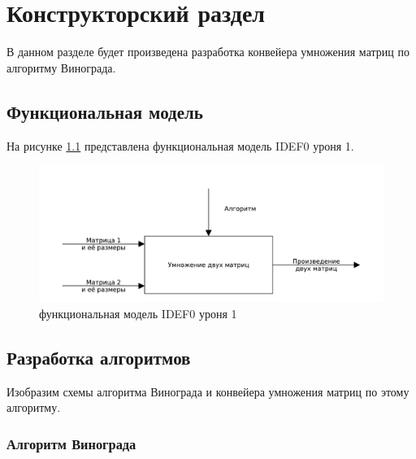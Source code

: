 \chapter{Конструкторский раздел}
\label{cha:design}

В данном разделе будет произведена разработка конвейера умножения матриц по алгоритму Винограда.

\section{Функциональная модель}
На рисунке \ref{img:idef0} представлена функциональная модель IDEF0 уроня 1.
\begin{figure}
    \centering
    \includegraphics[scale=.7]{pdf/mainIdef0.pdf}
    \caption{функциональная модель IDEF0 уроня 1}
    \label{img:idef0}
\end{figure}

\section{Разработка алгоритмов}
Изобразим схемы алгоритма Винограда и конвейера умножения матриц по этому алгоритму.

\subsection{Алгоритм Винограда}

